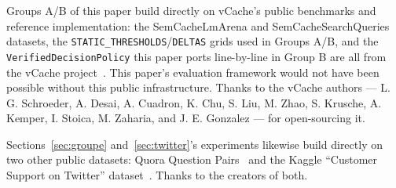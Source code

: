 \documentclass[11pt]{article}
\begin{document}
Groups A/B of this paper build directly on vCache's public benchmarks and reference implementation: the SemCacheLmArena and SemCacheSearchQueries datasets, the \texttt{STATIC\_\allowbreak{}THRESHOLDS}/\texttt{DELTAS} grids used in Groups A/B, and the \texttt{Verified\allowbreak{}Decision\allowbreak{}Policy} this paper ports line-by-line in Group B are all from the vCache project~\cite{vcache}. This paper's evaluation framework would not have been possible without this public infrastructure. Thanks to the vCache authors --- L. G. Schroeder, A. Desai, A. Cuadron, K. Chu, S. Liu, M. Zhao, S. Krusche, A. Kemper, I. Stoica, M. Zaharia, and J. E. Gonzalez --- for open-sourcing it.

Sections~\ref{sec:groupe} and~\ref{sec:twitter}'s experiments likewise build directly on two other public datasets: Quora Question Pairs~\cite{quora} and the Kaggle ``Customer Support on Twitter'' dataset~\cite{twittercs}. Thanks to the creators of both.
\end{document}
